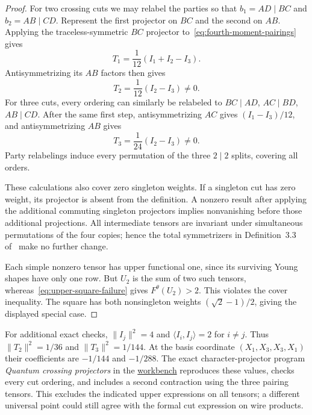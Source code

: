 \begin{proof}
For two crossing cuts we may relabel the parties so that $b_1=AD\mid BC$ and $b_2=AB\mid CD$.  Represent the first projector on $BC$ and the second on $AB$.  Applying the traceless-symmetric $BC$ projector to~\eqref{eq:fourth-moment-pairings} gives
\[
 T_1=\frac1{12}(I_1+I_2-I_3).
\]
Antisymmetrizing its $AB$ factors then gives
\[
 T_2=\frac1{12}(I_2-I_3)\ne0.
\]
For three cuts, every ordering can similarly be relabeled to $BC\mid AD$, $AC\mid BD$, $AB\mid CD$.  After the same first step, antisymmetrizing $AC$ gives $(I_1-I_3)/12$, and antisymmetrizing $AB$ gives
\[
 T_3=\frac1{24}(I_2-I_3)\ne0.
\]
Party relabelings induce every permutation of the three $2\mid2$ splits, covering all orders.

These calculations also cover zero singleton weights.  If a singleton cut has zero weight, its projector is absent from the definition.  A nonzero result after applying the additional commuting singleton projectors implies nonvanishing before those additional projections.  All intermediate tensors are invariant under simultaneous permutations of the four copies; hence the total symmetrizers in Definition~3.3 of~\cite{cvz-universal} make no further change.

Each simple nonzero tensor has upper functional one, since its surviving Young shapes have only one row.  But $U_2$ is the sum of two such tensors, whereas~\eqref{eq:upper-square-failure} gives $F^\theta(U_2)>2$.  This violates the cover inequality.  The square has both nonsingleton weights $(\sqrt2-1)/2$, giving the displayed special case.
\end{proof}

For additional exact checks, $\|I_j\|^2=4$ and $\langle I_i,I_j\rangle=2$ for $i\ne j$.  Thus $\|T_2\|^2=1/36$ and $\|T_3\|^2=1/144$.  At the basis coordinate $(X_1,X_3,X_3,X_1)$ their coefficients are $-1/144$ and $-1/288$.  The exact character-projector program \emph{Quantum crossing projectors} in the \href{\workbenchurl}{workbench} reproduces these values, checks every cut ordering, and includes a second contraction using the three pairing tensors.  This excludes the indicated upper expressions on all tensors; a different universal point could still agree with the formal cut expression on wire products.

